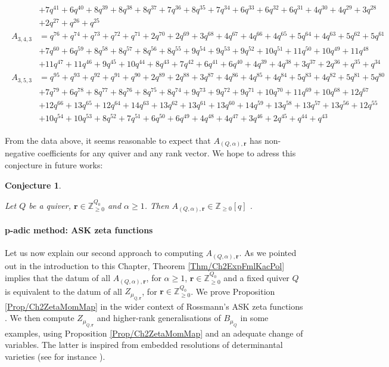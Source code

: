 \documentclass[11pt,english]{article}
\numberwithin{equation}{section}
\numberwithin{figure}{section}
\theoremstyle{definition}
\theoremstyle{plain}
\newtheorem{cj}[df]{Conjecture}
\theoremstyle{remark}
\newcommand\rr{\mathbf{r}}
\newcommand\ZZ{\mathbb{Z}}
\begin{document}
\[\begin{array}{l}
\begin{split}
& + 7q^{41} + 6q^{40} + 8q^{39} + 8q^{38} + 8q^{37} + 7q^{36} + 8q^{35} + 7q^{34} + 6q^{33} + 6q^{32} + 6q^{31} + 4q^{30} + 4q^{29} + 3q^{28} \\
& + 2q^{27} + q^{26} + q^{25} \\
A_{3,4,3} & = q^{76} + q^{74} + q^{73} + q^{72} + q^{71} + 2q^{70} + 2q^{69} + 3q^{68} + 4q^{67} + 4q^{66} + 4q^{65} + 5q^{64} + 4q^{63} + 5q^{62} + 5q^{61}  \\
& + 7q^{60} + 6q^{59} + 8q^{58} + 8q^{57} + 8q^{56}  + 8q^{55} + 9q^{54} + 9q^{53} + 9q^{52} + 10q^{51} + 11q^{50} + 10q^{49} + 11q^{48} \\
& + 11q^{47} + 11q^{46} + 9q^{45} + 10q^{44} + 8q^{43} + 7q^{42} + 6q^{41} + 6q^{40} + 4q^{39} + 4q^{38} + 3q^{37} + 2q^{36} + q^{35} + q^{34} \\
A_{3,5,3} & = q^{95} + q^{93} + q^{92} + q^{91} + q^{90} + 2q^{89} + 2q^{88} + 3q^{87} + 4q^{86} + 4q^{85} + 4q^{84} + 5q^{83} + 4q^{82} + 5q^{81}  + 5q^{80} \\
& + 7q^{79} + 6q^{78} + 8q^{77} + 8q^{76} + 8q^{75} + 8q^{74} + 9q^{73} + 9q^{72} + 9q^{71} + 10q^{70} + 11q^{69} + 10q^{68}  + 12q^{67} \\
& + 12q^{66} + 13q^{65} + 12q^{64} + 14q^{63} + 13q^{62} + 13q^{61} + 13q^{60} + 14q^{59} + 13q^{58} + 13q^{57} + 13q^{56} + 12q^{55} \\
& + 10q^{54} + 10q^{53} + 8q^{52} + 7q^{51} + 6q^{50} + 6q^{49} + 4q^{48} + 4q^{47} + 3q^{46} + 2q^{45} + q^{44} + q^{43}
\end{split}
\end{array}
\] 

From the data above, it seems reasonable to expect that $A_{(Q,\alpha),\rr}$
has non-negative coefficients for any quiver and any rank vector.
We hope to adress this conjecture in future works:

\begin{cj} \label{Conj/PosKacPolMult}

Let $Q$ be a quiver, $\rr\in\ZZ_{\geq0}^{Q_{0}}$ and $\alpha\geq1$.
Then $A_{(Q,\alpha),\rr}\in\ZZ_{\geq0}[q]$ .

\end{cj} 

\paragraph*{p-adic method: ASK zeta functions}

Let us now explain our second approach to computing $A_{(Q,\alpha),\rr}$.
As we pointed out in the introduction to this Chapter, Theorem \ref{Thm/Ch2ExpFmlKacPol}
implies that the datum of all $A_{(Q,\alpha),\rr}$, for $\alpha\geq1$,
$\rr\in\ZZ_{\geq0}^{Q_{0}}$ and a fixed quiver $Q$ is equivalent
to the datum of all $Z_{\mu_{Q,\rr}}$, for $\rr\in\ZZ_{\geq0}^{Q_{0}}$.
We prove Proposition \ref{Prop/Ch2ZetaMomMap} in the wider context
of Rossmann's ASK zeta functions \cite{Ros18,Ros20}. We then compute
$Z_{\mu_{Q,\rr}}$ and higher-rank generalisations of $B_{\mu_{Q}}$
in some examples, using Proposition \ref{Prop/Ch2ZetaMomMap} and
an adequate change of variables. The latter is inspired from embedded
resolutions of determinantal varieties (see for instance \cite{Vai84}).
\end{document}
